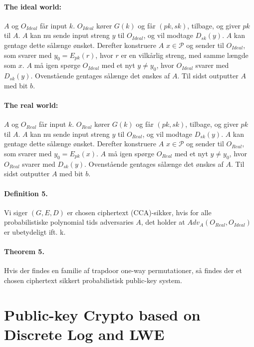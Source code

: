 \documentclass[paper=a4, fontsize=11pt]{scrartcl} %
\numberwithin{equation}{section} %
\numberwithin{figure}{section} %
\numberwithin{table}{section} %
\begin{document}
 	\paragraph{\textbf{The ideal world:}} $A$ og $O_{Ideal}$ får input $k$. $O_{Ideal}$ kører $G(k)$ og får $(pk,sk)$, tilbage, og giver $pk$ til $A$. $A$ kan nu sende input streng $y$ til $O_{Ideal}$, og vil modtage $D_{sk}(y)$. $A$ kan gentage dette sålænge ønsket. Derefter konstruere $A$ $x\in\mathcal{P}$ og sender til $O_{Ideal}$, som svarer med $y_0=E_{pk}(r)$, hvor $r$ er en vilkårlig streng, med samme længde som $x$. $A$ må igen spørge $O_{Ideal}$ med et nyt $y\not=y_0$, hvor $O_{Ideal}$ svarer med $D_{sk}(y)$. Ovenstående gentages sålænge det ønskes af $A$. Til sidst outputter $A$ med bit $b$.
 	\paragraph{\textbf{The real world:}} $A$ og $O_{Real}$ får input $k$. $O_{Real}$ kører $G(k)$ og får $(pk,sk)$, tilbage, og giver $pk$ til $A$. $A$ kan nu sende input streng $y$ til $O_{Real}$, og vil modtage $D_{sk}(y)$. $A$ kan gentage dette sålænge ønsket. Derefter konstruere $A$ $x\in\mathcal{P}$ og sender til $O_{Real}$, som svarer med $y_0=E_{pk}(x)$. $A$ må igen spørge $O_{Real}$ med et nyt $y\not=y_0$, hvor $O_{Real}$ svarer med $D_{sk}(y)$. Ovenstående gentages sålænge det ønskes af $A$. Til sidst outputter $A$ med bit $b$.
 	
 	\paragraph{\textbf{Definition 5.}} Vi siger $(G,E,D)$ er chosen ciphertext (CCA)-sikker, hvis for alle probabilistiske polynomial tids adversaries $A$, det holder at $Adv_A(O_{Real},O_{Ideal})$ er ubetydeligt ift. k.
 	
 	\paragraph{\textbf{Theorem 5.}} Hvis der findes en familie af trapdoor one-way permutationer, så findes der et chosen ciphertext sikkert probabilistisk public-key system.
 	
 	\newpage
	
	\section{Public-key Crypto based on Discrete Log and LWE}
	
\end{document}
